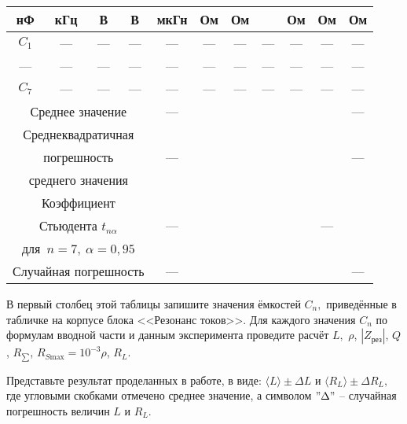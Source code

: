 \begin{lab:task}
\begin{enumerate}
\begin{center}
\begin{table}[h!]
\begin{center}
\begin{tabular}{|c|c|c|c|c|c|c|c|c|c|c|}
	                нФ & кГц & В & В & мкГн & Ом & Ом &  & Ом & Ом & Ом \\
	                \hline
	                $C_1$ & {---} & --- & --- & --- & --- & --- & --- & --- & --- & --- \\
	                \hline
	                --- & --- & --- & --- & --- & --- & --- & --- & --- & ---& ---\\
	                \hline
	                $C_7$& --- & --- & --- & --- & --- & --- & ---& --- &--- &---\\
	                \hline
	                \multicolumn{4}{|c|}{ Среднее значение} & --- & & & & & &--- \\
	                \hline
	                \multicolumn{4}{|c|}{ Среднеквадратичная } & & & & & & & \\
	                \multicolumn{4}{|c|}{ погрешность } & ---& & & & & &--- \\
	                \multicolumn{4}{|c|}{ среднего значения } &  & & & & && \\
	                \hline
	                \multicolumn{4}{|c|}{ Коэффициент } & & & & & & & \\
	                \multicolumn{4}{|c|}{ Стьюдента $t_{n\alpha}$ } & ---& & & & &---& \\
	                \multicolumn{4}{|c|}{для~$n=7,~\alpha=0,95$} &  & & & & && \\
			                    \hline
	                \multicolumn{4}{|c|}{ Случайная погрешность } & ---& & & & & &---\\
	
	                \hline
	            \end{tabular}
	        \end{center}
	    \end{table}
	\end{center}
В первый столбец этой таблицы запишите значения ёмкостей $C_n,$ приведённые в табличке на корпусе блока <<Резонанс токов>>. Для каждого значения $C_n$ по формулам вводной части и данным эксперимента проведите  расчёт $L,$ $\rho$, $|Z_{\text{рез}}|$, $Q$, $R_{\scriptstyle \sum}$, $R_{S \text{max}}=10^{-3}\rho$, $R_L$.

Представьте результат  проделанных в работе, в виде: $\langle L \rangle\pm\Delta L$ и $\langle R_L\rangle\pm\Delta R_L,$ где угловыми скобками отмечено среднее значение, а символом $"\Delta"$ – случайная погрешность величин $L$ и $R_L.$


\end{enumerate}
\end{lab:task}
